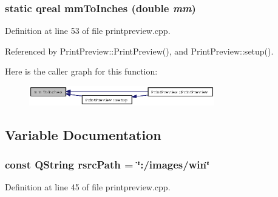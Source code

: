 \subsubsection{\setlength{\rightskip}{0pt plus 5cm}static qreal mm\-To\-Inches (double {\em mm})\hspace{0.3cm}{\tt  [inline, static]}}\label{printpreview_8cpp_09e5069d26dad860da983478e7b29c5e}




Definition at line 53 of file printpreview.cpp.

Referenced by Print\-Preview::Print\-Preview(), and Print\-Preview::setup().

Here is the caller graph for this function:\begin{figure}[H]
\begin{center}
\leavevmode
\includegraphics[width=229pt]{printpreview_8cpp_09e5069d26dad860da983478e7b29c5e_icgraph}
\end{center}
\end{figure}


\subsection{Variable Documentation}
\subsubsection{\setlength{\rightskip}{0pt plus 5cm}const QString {\bf rsrc\-Path} = \char`\"{}:/images/win\char`\"{}}\label{printpreview_8cpp_48f57ebe9b64d55d98423f57eda3e6bb}




Definition at line 45 of file printpreview.cpp.